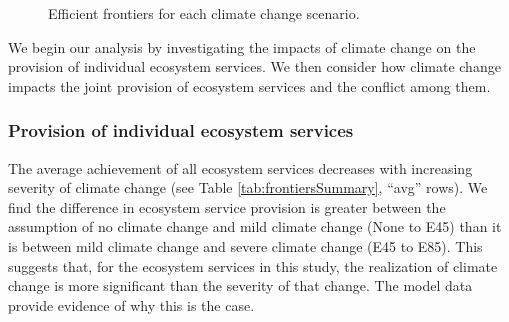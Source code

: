 \begin{figure}[ht!]
  \hfill\centering
  \caption[Frontiers for each climate change scenario]{Efficient frontiers for each climate change scenario.}
  \label{fig:frontiersAll}
\end{figure}

We begin our analysis by investigating the impacts of climate change on the provision of individual ecosystem services. We then consider how climate change impacts the joint provision of ecosystem services and the conflict among them.

\subsubsection{Provision of individual ecosystem services}
The average achievement of all ecosystem services decreases with increasing severity of climate change (see Table \ref{tab:frontiersSummary}, ``avg'' rows). We find the difference in ecosystem service provision is greater between the assumption of no climate change and mild climate change (None to E45) than it is between mild climate change and severe climate change (E45 to E85). This suggests that, for the ecosystem services in this study, the realization of climate change is more significant than the severity of that change. The model data provide evidence of why this is the case.

